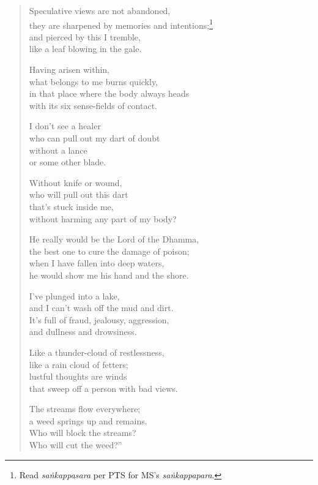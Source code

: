 \documentclass[12pt,openany]{book}%
\begin{document}
\begin{verse}
Speculative views are not abandoned, \\
they are sharpened by memories and intentions;\footnote{Read \textit{\textsanskrit{saṅkappasara}} per PTS for MS’s \textit{\textsanskrit{saṅkappapara}}. } \\
and pierced by this I tremble, \\
like a leaf blowing in the gale. 

Having arisen within, \\
what belongs to me burns quickly, \\
in that place where the body always heads \\
with its six sense-fields of contact. 

I don’t see a healer \\
who can pull out my dart of doubt \\
without a lance \\
or some other blade. 

Without knife or wound, \\
who will pull out this dart \\
that’s stuck inside me, \\
without harming any part of my body? 

He really would be the Lord of the Dhamma, \\
the best one to cure the damage of poison; \\
when I have fallen into deep waters, \\
he would show me his hand and the shore. 

I’ve plunged into a lake, \\
and I can’t wash off the mud and dirt. \\
It’s full of fraud, jealousy, aggression, \\
and dullness and drowsiness. 

Like a thunder-cloud of restlessness, \\
like a rain cloud of fetters; \\
lustful thoughts are winds \\
that sweep off a person with bad views. 

The streams flow everywhere; \\
a weed springs up and remains. \\
Who will block the streams? \\
Who will cut the weed?” 


\end{verse}
\end{document}
